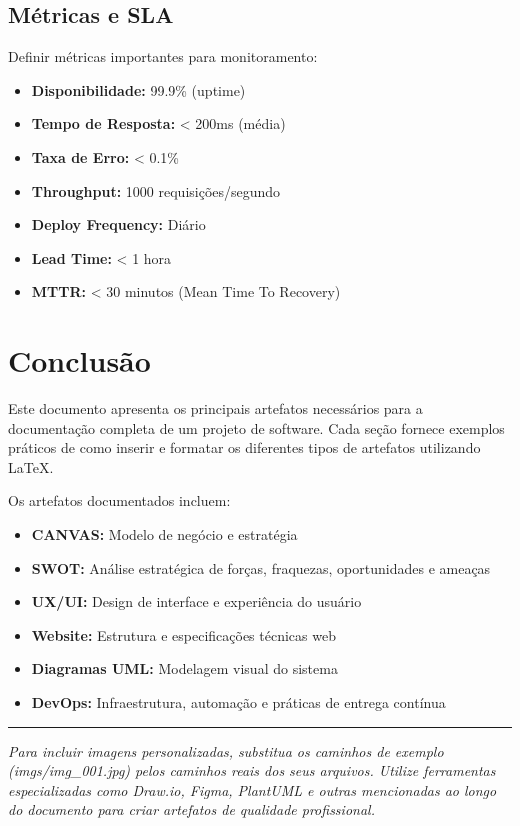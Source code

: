 \documentclass[11pt,a4paper]{article}
\begin{document}
\subsection{Métricas e SLA}

Definir métricas importantes para monitoramento:

\begin{itemize}
    \item \textbf{Disponibilidade:} 99.9\% (uptime)
    \item \textbf{Tempo de Resposta:} < 200ms (média)
    \item \textbf{Taxa de Erro:} < 0.1\%
    \item \textbf{Throughput:} 1000 requisições/segundo
    \item \textbf{Deploy Frequency:} Diário
    \item \textbf{Lead Time:} < 1 hora
    \item \textbf{MTTR:} < 30 minutos (Mean Time To Recovery)
\end{itemize}

\newpage
\section*{Conclusão}

Este documento apresenta os principais artefatos necessários para a documentação completa de um projeto de software. Cada seção fornece exemplos práticos de como inserir e formatar os diferentes tipos de artefatos utilizando \LaTeX.

Os artefatos documentados incluem:
\begin{itemize}
    \item \textbf{CANVAS:} Modelo de negócio e estratégia
    \item \textbf{SWOT:} Análise estratégica de forças, fraquezas, oportunidades e ameaças
    \item \textbf{UX/UI:} Design de interface e experiência do usuário
    \item \textbf{Website:} Estrutura e especificações técnicas web
    \item \textbf{Diagramas UML:} Modelagem visual do sistema
    \item \textbf{DevOps:} Infraestrutura, automação e práticas de entrega contínua
\end{itemize}

\vspace{1cm}
\noindent\rule{\textwidth}{0.5pt}
\vspace{0.3cm}

\noindent\textit{Para incluir imagens personalizadas, substitua os caminhos de exemplo (imgs/img\_001.jpg) pelos caminhos reais dos seus arquivos. Utilize ferramentas especializadas como Draw.io, Figma, PlantUML e outras mencionadas ao longo do documento para criar artefatos de qualidade profissional.}

\newpage
{}


\end{document}
